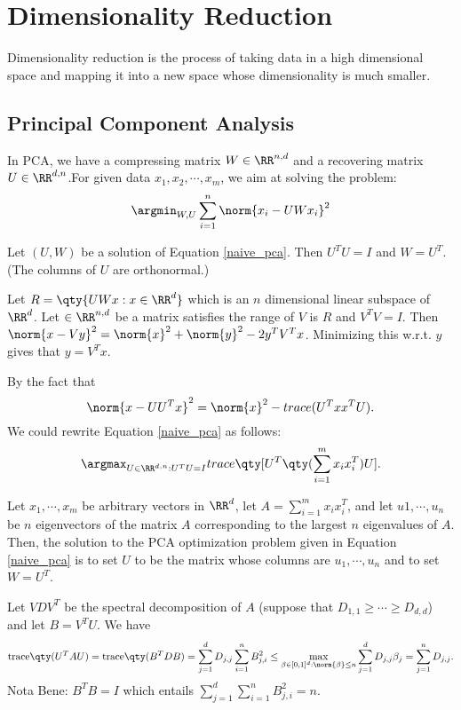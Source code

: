 \section{Dimensionality Reduction}%
Dimensionality reduction is the process of taking data in a high dimensional space and mapping it into a new space whose dimensionality is much smaller.

\subsection{Principal Component Analysis}
In PCA, we have a compressing matrix $W\in\RR^{n,d}$ and a recovering matrix  $U\in\RR^{d,n}$.For given data  $x_1,x_2,\cdots,x_m$, we aim at solving the problem:
\begin{equation}
	\argmin_{W,U}\sum^{n}_{i=1} \norm{x_i-UWx_i}^2
	\label{naive_pca}
\end{equation}

\begin{lemma}
	Let $(U,W)$ be a solution of Equation \ref{naive_pca}. Then $U^TU=I$ and  $W=U^T$. (The columns of $U$ are orthonormal.)
\end{lemma}

\begin{prf}
	Let $R=\qty{UWx:x\in\RR^d}$ which is an $n$ dimensional linear subspace of $\RR^d$. Let $\in\RR^{n,d}$ be a matrix satisfies  the range of $V$ is  $R$ and  $V^TV=I$.
	Then $\norm{x-Vy}^2=\norm{x}^2+\norm{y}^2-2y^TV^Tx$. Minimizing this w.r.t. $y$ gives that  $y=V^Tx$.
\end{prf}

By the fact that
\[
	\norm{x-UU^Tx}^2=\norm{x}^2-\-{trace}(U^Txx^TU)
.\] We could rewrite Equation \ref{naive_pca} as follows:
\[
	\argmax_{U\in\RR^{d,n}:U^TU=I}\-{trace}\qty[U^T \qty(\sum^{m}_{i=1}x_ix_i^T) U]
.\] 
\begin{thm}
	Let $x_1,\cdots, x_m$ be arbitrary vectors in $\RR^d$,
	let $A = \sum^{m}_{i=1}  x_ix_i^T$, 
	and let $u1,\cdots, u_n$ be $n$ eigenvectors of the matrix $A$ corresponding to the largest $n$ eigenvalues of $A$.
	Then, the solution to the PCA optimization problem given in Equation \ref{naive_pca} is to set $U$ to be the matrix whose columns are $u_1,\cdots,u_n$ and to set $W = U^T$.
\end{thm}
\begin{prf}
	Let $VDV^T$ be the spectral decomposition of  $A$ (suppose that $D_{1,1}\ge \cdots\ge D_{d,d}$) and let $B=V^TU$. We have
	 \[
		 \mathrm{trace}\qty(U^TAU)
		 =
		 \mathrm{trace}\qty(B^TDB)
		 =
		 \sum^{d}_{j=1} D_{j,j}\sum^{n}_{i=1} B^2_{j,i}
		 \le
		 \max_{\*\beta\in[0,1]^d:\norm{\*\beta}\le n}\sum^{d}_{j=1} D_{j,j}\beta_j
		 =
		 \sum^{n}_{j=1} D_{j,j}
	.\] 
	Nota Bene: $B^TB=I$ which entails  $ \sum^{d}_{j=1} \sum^{n}_{i=1} B^2_{j,i}=n $.
\end{prf}
\newpage
